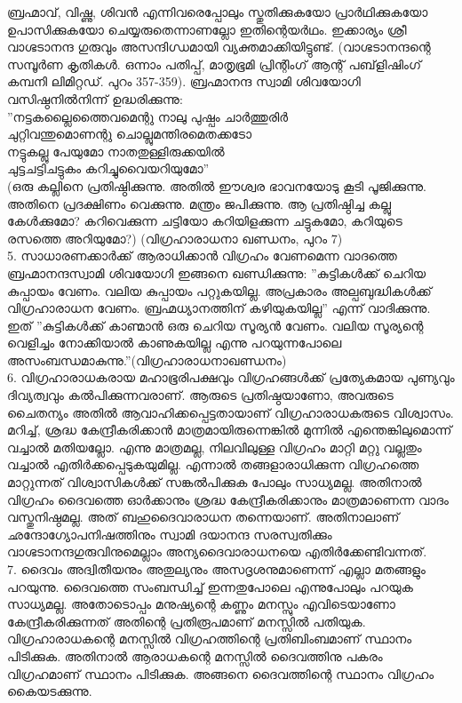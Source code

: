 ബ്രഹ്മാവ്, വിഷ്ണു, ശിവന്‍ എന്നിവരെപ്പോലും സ്തുതിക്കുകയോ പ്രാര്‍ഥിക്കുകയോ ഉപാസിക്കുകയോ ചെയ്യരുതെന്നാണല്ലോ ഇതിന്റെയര്‍ഥം. ഇക്കാര്യം ശ്രീ വാഗ്ഭടാനന്ദ ഗുരുവും അസന്ദിഗ്ധമായി വ്യക്തമാക്കിയിട്ടുണ്ട്. (വാഗ്ഭടാനന്ദന്റെ സമ്പൂര്‍ണ കൃതികള്‍. ഒന്നാം പതിപ്പ്, മാതൃഭൂമി പ്രിന്റിംഗ് ആന്റ് പബ്‌ളിഷിംഗ് കമ്പനി ലിമിറ്റഡ്. പുറം 357-359).
ബ്രഹ്മാനന്ദ സ്വാമി ശിവയോഗി വസിഷ്ഠനില്‍നിന്ന് ഉദ്ധരിക്കുന്നു:\\
''നട്ടകല്ലൈത്തൈവമെന്റു നാലു പുഷ്പം ചാര്‍ത്തുരിര്‍\\
ചുറ്റിവന്തുമൊണന്റു ചൊല്ലുമന്തിരമെതക്കടോ\\
നട്ടുകല്ലു പേയുമോ നാതതുള്ളിരുക്കയില്‍\\
ചുട്ടചട്ടിചട്ടുകം കറിച്ചുവൈയറിയുമോ''\\
(ഒരു കല്ലിനെ പ്രതിഷ്ഠിക്കുന്നു. അതില്‍ ഈശ്വര ഭാവനയോടു കൂടി പൂജിക്കുന്നു. അതിനെ പ്രദക്ഷിണം വെക്കുന്നു. മന്ത്രം ജപിക്കുന്നു. ആ പ്രതിഷ്ഠിച്ച കല്ലു കേള്‍ക്കുമോ? കറിവെക്കുന്ന ചട്ടിയോ കറിയിളക്കുന്ന ചട്ടുകമോ, കറിയുടെ രസത്തെ അറിയുമോ?) (വിഗ്രഹാരാധനാ ഖണ്ഡനം, പുറം 7)\\
5. സാധാരണക്കാര്‍ക്ക് ആരാധിക്കാന്‍ വിഗ്രഹം വേണമെന്ന വാദത്തെ ബ്രഹ്മാനന്ദസ്വാമി ശിവയോഗി ഇങ്ങനെ ഖണ്ഡിക്കുന്നു: ''കുട്ടികള്‍ക്ക് ചെറിയ കുപ്പായം വേണം. വലിയ കുപ്പായം പറ്റുകയില്ല. അപ്രകാരം അല്പബുദ്ധികള്‍ക്ക് വിഗ്രഹാരാധന വേണം. ബ്രഹ്മധ്യാനത്തിന് കഴിയുകയില്ല'' എന്ന് വാദിക്കുന്നു. ഇത് ''കുട്ടികള്‍ക്ക് കാണ്മാന്‍ ഒരു ചെറിയ സൂര്യന്‍ വേണം. വലിയ സൂര്യന്റെ വെളിച്ചം നോക്കിയാല്‍ കാണുകയില്ല എന്നു പറയുന്നപോലെ അസംബന്ധമാകുന്നു.''(വിഗ്രഹാരാധനാഖണ്ഡനം)\\
6. വിഗ്രഹാരാധകരായ മഹാഭൂരിപക്ഷവും വിഗ്രഹങ്ങള്‍ക്ക് പ്രത്യേകമായ പുണ്യവും ദിവ്യത്വവും കല്‍പിക്കുന്നവരാണ്. ആരുടെ പ്രതിഷ്ഠയാണോ, അവരുടെ ചൈതന്യം അതില്‍ ആവാഹിക്കപ്പെട്ടതായാണ് വിഗ്രഹാരാധകരുടെ വിശ്വാസം. മറിച്ച്, ശ്രദ്ധ കേന്ദ്രീകരിക്കാന്‍ മാത്രമായിരുന്നെങ്കില്‍ മുന്നില്‍ എന്തെങ്കിലുമൊന്ന് വച്ചാല്‍ മതിയല്ലോ. എന്നു മാത്രമല്ല, നിലവിലുള്ള വിഗ്രഹം മാറ്റി മറ്റു വല്ലതും വച്ചാല്‍ എതിര്‍ക്കപ്പെടുകയുമില്ല. എന്നാല്‍ തങ്ങളാരാധിക്കുന്ന വിഗ്രഹത്തെ മാറ്റുന്നത് വിശ്വാസികള്‍ക്ക് സങ്കല്‍പിക്കുക പോലും സാധ്യമല്ല. അതിനാല്‍ വിഗ്രഹം ദൈവത്തെ ഓര്‍ക്കാനും ശ്രദ്ധ കേന്ദ്രീകരിക്കാനും മാത്രമാണെന്ന വാദം വസ്തുനിഷ്ഠമല്ല. അത് ബഹുദൈവാരാധന തന്നെയാണ്. അതിനാലാണ് ഛന്ദോഗ്യോപനിഷത്തിനും സ്വാമി ദയാനന്ദ സരസ്വതിക്കും വാഗ്ഭടാനന്ദഗുരുവിനുമെല്ലാം അന്യദൈവാരാധനയെ എതിര്‍ക്കേണ്ടിവന്നത്.\\
7. ദൈവം അദ്വിതീയനും അതുല്യനും അസദൃശനുമാണെന്ന് എല്ലാ മതങ്ങളും പറയുന്നു. ദൈവത്തെ സംബന്ധിച്ച് ഇന്നതുപോലെ എന്നുപോലും പറയുക സാധ്യമല്ല. അതോടൊപ്പം മനുഷ്യന്റെ കണ്ണും മനസ്സും എവിടെയാണോ കേന്ദ്രീകരിക്കുന്നത് അതിന്റെ പ്രതിരൂപമാണ് മനസ്സില്‍ പതിയുക. വിഗ്രഹാരാധകന്റെ മനസ്സില്‍ വിഗ്രഹത്തിന്റെ പ്രതിബിംബമാണ് സ്ഥാനം പിടിക്കുക. അതിനാല്‍ ആരാധകന്റെ മനസ്സില്‍ ദൈവത്തിനു പകരം വിഗ്രഹമാണ് സ്ഥാനം പിടിക്കുക. അങ്ങനെ ദൈവത്തിന്റെ സ്ഥാനം വിഗ്രഹം കൈയടക്കുന്നു.\\
